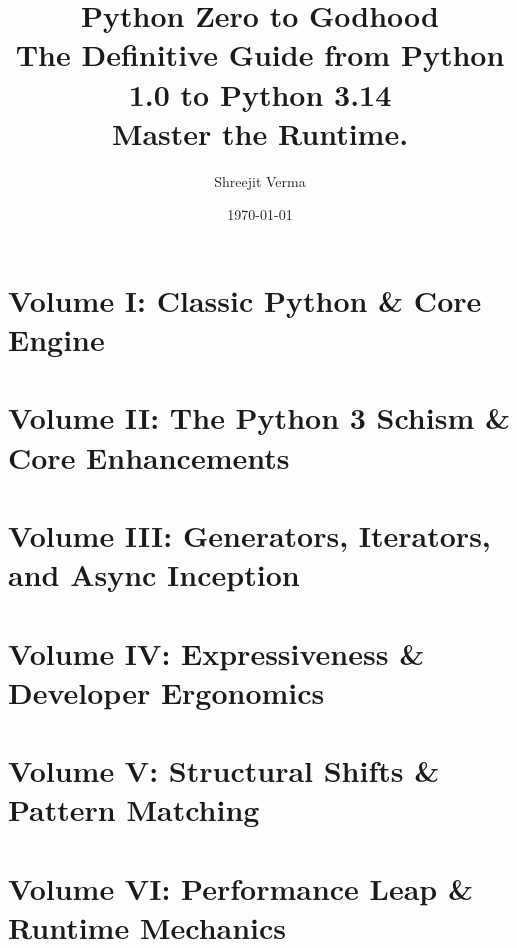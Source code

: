 \documentclass[11pt, a4paper, openany]{book}
\title{
    \vspace*{2cm}
    \Huge \textbf{Python Zero to Godhood} \\
    \vspace{0.5cm}
    \LARGE The Definitive Guide from Python 1.0 to Python 3.14 \\
    \vspace{2cm}
    \textbf{\Large Master the Runtime.}
}
\author{\Large Shreejit Verma}
\date{\today}
\begin{document}
\frontmatter
\maketitle
\tableofcontents

\mainmatter

\part{Volume I: Classic Python \& Core Engine}






\part{Volume II: The Python 3 Schism \& Core Enhancements}


\part{Volume III: Generators, Iterators, and Async Inception}



\part{Volume IV: Expressiveness \& Developer Ergonomics}


\part{Volume V: Structural Shifts \& Pattern Matching}



\part{Volume VI: Performance Leap \& Runtime Mechanics}



\end{document}
